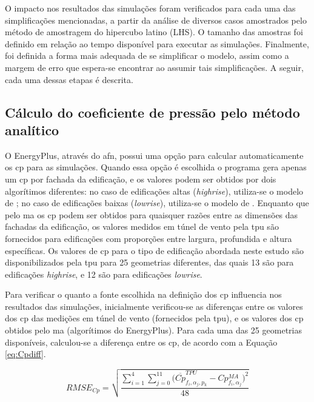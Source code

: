 \documentclass[brazil,hardcopy,openany]{ufscthesis} %
\begin{document}
O impacto nos resultados das simulações foram verificados para cada uma das simplificações mencionadas, a partir da análise de diversos casos amostrados pelo método de amostragem do hipercubo latino (LHS). O tamanho das amostras foi definido em relação ao tempo disponível para executar as simulações.
Finalmente, foi definida a forma mais adequada de se simplificar o modelo, assim como a margem de erro que espera-se encontrar ao assumir tais simplificações.
A seguir, cada uma dessas etapas é descrita.

\subsection*{Cálculo do coeficiente de pressão pelo método analítico}

O EnergyPlus, através do \acrshort{afn}, possui uma opção para calcular automaticamente os \acrshort{cp} para as simulações.
Quando essa opção é escolhida o programa gera apenas um \acrshort{cp} por fachada da edificação, e os valores podem ser obtidos por dois algorítimos diferentes: no caso de edificações altas (\textit{highrise}), utiliza-se o modelo de ; no caso de edificações baixas (\textit{lowrise}), utiliza-se o modelo de .
Enquanto que pelo \acrlong{ma} os \acrshort{cp} podem ser obtidos para quaisquer razões entre as dimensões das fachadas da edificação, os valores medidos em túnel de vento pela \acrshort{tpu} são fornecidos para edificações com proporções entre largura, profundida e altura específicas.
Os valores de \acrshort{cp} para o tipo de edificação abordada neste estudo são disponibilizados pela \acrshort{tpu} para 25 geometrias diferentes, das quais 13 são para edificações \textit{highrise}, e 12 são para edificações \textit{lowrise}.

Para verificar o quanto a fonte escolhida na definição dos \acrshort{cp} influencia nos resultados das simulações, inicialmente verificou-se as diferenças entre os valores dos \acrshort{cp} das medições em túnel de vento (fornecidos pela \acrshort{tpu}), e os valores dos \acrshort{cp} obtidos pelo \acrlong{ma} (algorítimos do EnergyPlus). Para cada uma das 25 geometrias disponíveis, calculou-se a diferença entre os \acrshort{cp}, de acordo com a Equação \ref{eq:Cpdiff}.

\begin{equation}
\label{eq:Cpdiff}
RMSE_{Cp} = \sqrt{\frac{\sum_{i=1}^{4}{\sum_{j=0}^{11}{(\overline{Cp}^{TPU}_{f_i,\alpha_j,p_k} - Cp^{MA}_{f_i,\alpha_j}})^2}}{48}}
\end{equation}
\end{document}

